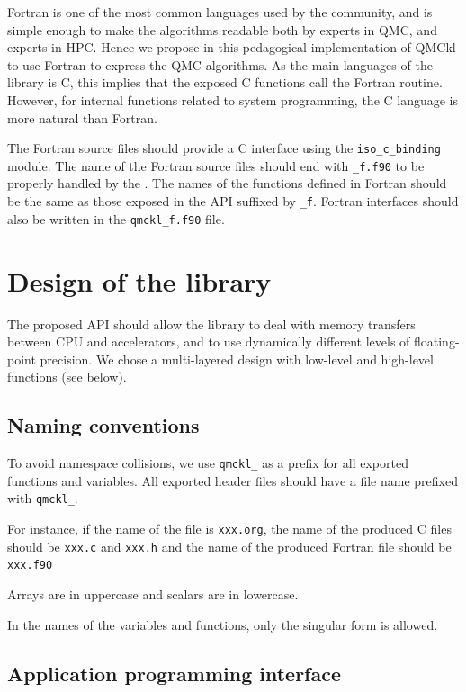 Fortran is one of the most common languages used by the community, and
is simple enough to make the algorithms readable both by experts in
\ac{QMC}, and experts in \ac{HPC}. Hence we propose in this
pedagogical implementation of \ac{QMCkl} to use Fortran to express the
QMC algorithms. As the main languages of the library is C, this
implies that the exposed C functions call the Fortran routine.
However, for internal functions related to system programming, the C
language is more natural than Fortran.

The  Fortran  source  files  should provide  a  C  interface  using the
\texttt{iso_c_binding} module. The name of the Fortran source files
should end with \texttt{_f.f90} to be properly handled by the
{\Makefile}.  The names of the functions defined in Fortran should be the
same as those exposed in the \ac{API} suffixed by \texttt{_f}.
Fortran interfaces should also be written in the
\texttt{qmckl_f.f90} file.

\section{Design of the library}

The proposed \ac{API} should allow the library to deal with memory
transfers between CPU and accelerators, and to use dynamically
different levels of floating-point precision.  We chose a
multi-layered design with low-level and high-level functions (see
below).

\subsection{Naming conventions}

To avoid namespace collisions, we use \texttt{qmckl_} as a prefix for
all exported functions and variables.  All exported header files
should have a file name prefixed with \texttt{qmckl_}.

For instance, if the name of the {\orgmode} file is
\texttt{xxx.org}, the name of the produced C files should
be \texttt{xxx.c} and \texttt{xxx.h} and the
name of the produced Fortran file should be
\texttt{xxx.f90}

Arrays are in uppercase and scalars are in lowercase.

In the  names of  the variables and  functions, only the singular
form is allowed.

\subsection{Application programming interface}

